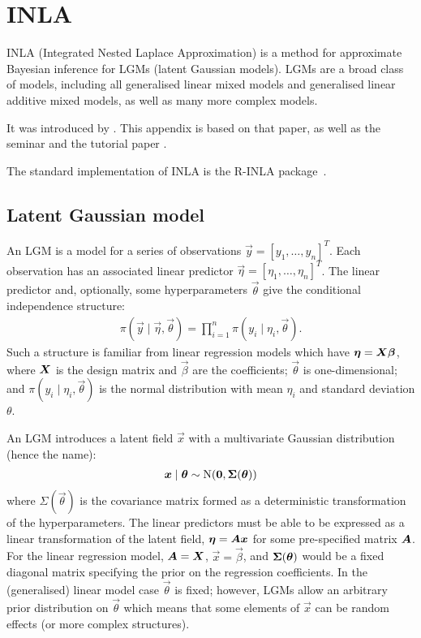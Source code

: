 \documentclass[thesis.tex]{subfiles}
\begin{document}
\chapter{INLA} \label{transmission:sec:INLA}


INLA (Integrated Nested Laplace Approximation) is a method for approximate Bayesian inference for LGMs (latent Gaussian models).
LGMs are a broad class of models, including all generalised linear mixed models and generalised linear additive mixed models, as well as many more complex models.

It was introduced by \textcite{rueINLA}.
This appendix is based on that paper, as well as the seminar \textcite{rueINLAseminar} and the tutorial paper \textcite{martinoINLAtutorial}.

The standard implementation of INLA is the R-INLA package~\autocite{RINLA}.

\section{Latent Gaussian model}

An LGM is a model for a series of observations $\vec{y} = [y_1, \dots, y_n]^T$.
Each observation has an associated linear predictor $\vec{\eta} = [\eta_1, \dots, \eta_n]^T$.
The linear predictor and, optionally, some hyperparameters $\vec{\theta}$ give the conditional independence structure:
\begin{align}
    \pi(\vec{y} \mid \vec{\eta}, \vec{\theta}) = \prod_{i=1}^n \pi(y_i \mid \eta_i, \vec{\theta}).
\end{align}
Such a structure is familiar from linear regression models which have $\bm{\eta} = \bm{X} \bm{\beta}$, where $\bm{X}$ is the design matrix and $\vec{\beta}$ are the coefficients; $\vec{\theta}$ is one-dimensional; and $\pi(y_i \mid \eta_i, \vec{\theta})$ is the normal distribution with mean $\eta_i$ and standard deviation $\theta$.

An LGM introduces a latent field $\vec{x}$ with a multivariate Gaussian distribution (hence the name):
\begin{align}
    \bm{x} \mid \bm{\theta} \sim \operatorname{N}(\bm{0}, \bm{\Sigma}(\bm{\theta}))
\end{align}
where $\Sigma(\vec{\theta})$ is the covariance matrix formed as a deterministic transformation of the hyperparameters.
The linear predictors must be able to be expressed as a linear transformation of the latent field, \ie $\bm{\eta} = \bm{A} \bm{x}$ for some pre-specified matrix $\bm{A}$.
For the linear regression model, $\bm{A} = \bm{X}$, $\vec{x} = \vec{\beta}$, and $\bm{\Sigma}(\bm{\theta})$ would be a fixed diagonal matrix specifying the prior on the regression coefficients.
In the (generalised) linear model case $\vec{\theta}$ is fixed; however, LGMs allow an arbitrary prior distribution on $\vec{\theta}$ which means that some elements of $\vec{x}$ can be random effects (or more complex structures).
\end{document}
